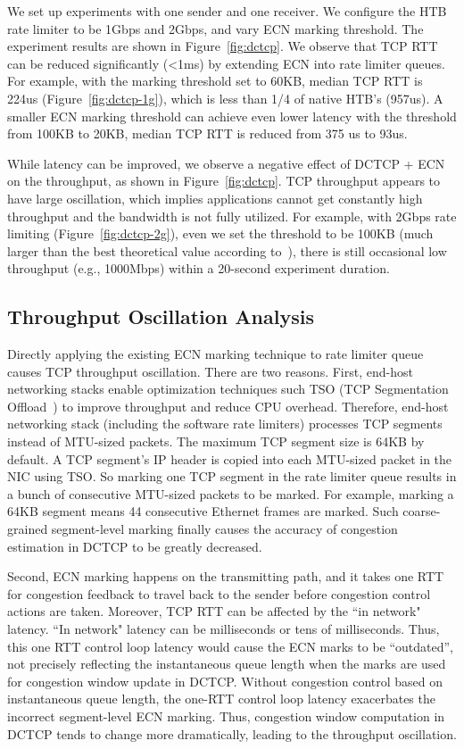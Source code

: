 We set up experiments with one sender and one receiver. We configure the HTB rate limiter to be 1Gbps and 2Gbps, 
and vary ECN marking threshold. The experiment results are shown in Figure~\ref{fig:dctcp}. 
We observe that TCP RTT can be reduced significantly (<1ms) by extending ECN into rate limiter queues. 
For example, with the marking threshold set to 60KB, median TCP RTT is 224us (Figure~\ref{fig:dctcp-1g}), 
which is less than 1/4 of native HTB's (957us). A smaller ECN marking threshold 
can achieve even lower latency \textemdash\xspace with the threshold from 100KB to 20KB, median TCP RTT is reduced from 375 us to 93us.

While latency can be improved, we observe a negative effect of DCTCP + ECN on the throughput, as shown in Figure~\ref{fig:dctcp}.
TCP throughput appears to have large oscillation, 
which implies applications cannot get constantly high throughput and the bandwidth is not fully utilized. 
For example, with 2Gbps rate limiting (Figure~\ref{fig:dctcp-2g}), 
even we set the threshold to be 100KB (much larger than the best theoretical value according to~\cite{dctcp}), 
there is still occasional low throughput (e.g., 1000Mbps) within a 20-second experiment duration.

\subsection{Throughput Oscillation Analysis}
Directly applying the existing ECN marking technique to rate limiter queue 
causes TCP throughput oscillation. There are two reasons. First, end-host networking stacks 
enable optimization techniques such TSO (TCP Segmentation Offload~\cite{tcp-segment-offload}) to 
improve throughput and reduce CPU overhead. Therefore, end-host networking stack 
(including the software rate limiters) processes TCP segments instead of MTU-sized packets. 
The maximum TCP segment size is 64KB by default. A TCP segment's IP header is copied 
into each MTU-sized packet in the NIC using TSO. So marking one TCP segment in the rate limiter queue 
results in a bunch of consecutive MTU-sized packets to be marked.
For example, marking a 64KB segment means 44 consecutive Ethernet frames are marked. 
Such coarse-grained segment-level marking finally causes the accuracy of congestion estimation in DCTCP to be greatly decreased. 

Second, ECN marking happens on the transmitting path, and it takes one RTT for 
congestion feedback to travel back to the sender before congestion control actions are taken. 
Moreover, TCP RTT can be affected by the ``in network" latency. ``In network" latency can be milliseconds or tens of milliseconds. 
Thus, this one RTT control loop latency 
would cause the ECN marks to be ``outdated'', not precisely reflecting the instantaneous queue length 
when the marks are used for congestion window update in DCTCP.
Without congestion control based on instantaneous queue length, 
the one-RTT control loop latency exacerbates the incorrect segment-level ECN marking. 
Thus, congestion window computation in DCTCP tends to change more dramatically, leading to the throughput oscillation.


